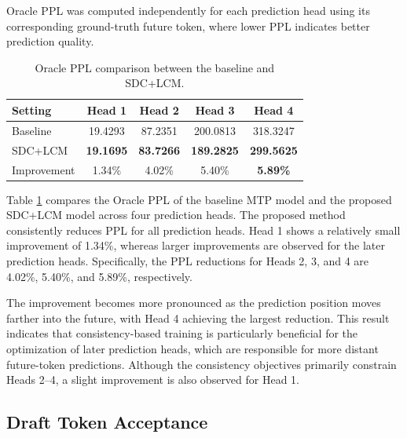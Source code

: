 Oracle PPL was computed independently for each prediction head using
its corresponding ground-truth future token, where lower PPL indicates
better prediction quality.

\begin{table}[!htbp]
    \centering
    \caption{Oracle PPL comparison between the baseline and SDC+LCM.}
    \label{tab:oracle_ppl}
    \begin{tabular}{lcccc}
        \toprule[1.25pt]
        Setting & Head 1 & Head 2 & Head 3 & Head 4 \\
        \midrule
        Baseline
        & 19.4293 & 87.2351 & 200.0813 & 318.3247 \\

        SDC+LCM
        & \textbf{19.1695}
        & \textbf{83.7266}
        & \textbf{189.2825}
        & \textbf{299.5625} \\

        Improvement
        & 1.34\%
        & 4.02\%
        & 5.40\%
        & \textbf{5.89\%} \\
        \bottomrule[1.25pt]
    \end{tabular}
\end{table}

Table \ref{tab:oracle_ppl} compares the Oracle PPL of the baseline MTP model and the proposed SDC+LCM model across four prediction heads. The proposed method consistently reduces PPL for all prediction heads. Head 1 shows a relatively small improvement of 1.34\%, whereas larger improvements are observed for the later prediction heads. Specifically, the PPL reductions for Heads 2, 3, and 4 are 4.02\%, 5.40\%, and 5.89\%, respectively.

The improvement becomes more pronounced as the prediction position moves farther into the future, with Head 4 achieving the largest reduction. This result indicates that consistency-based training is particularly beneficial for the optimization of later prediction heads, which are responsible for more distant future-token predictions. Although the consistency objectives primarily constrain Heads 2–4, a slight improvement is also observed for Head 1.

\subsection{Draft Token Acceptance}\label{subsec:draft_token_acceptance}

